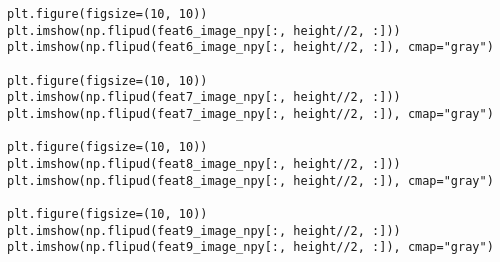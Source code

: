\begin{lstlisting}
plt.figure(figsize=(10, 10))
plt.imshow(np.flipud(feat6_image_npy[:, height//2, :]))
plt.imshow(np.flipud(feat6_image_npy[:, height//2, :]), cmap="gray")

plt.figure(figsize=(10, 10))
plt.imshow(np.flipud(feat7_image_npy[:, height//2, :]))
plt.imshow(np.flipud(feat7_image_npy[:, height//2, :]), cmap="gray")

plt.figure(figsize=(10, 10))
plt.imshow(np.flipud(feat8_image_npy[:, height//2, :]))
plt.imshow(np.flipud(feat8_image_npy[:, height//2, :]), cmap="gray")

plt.figure(figsize=(10, 10))
plt.imshow(np.flipud(feat9_image_npy[:, height//2, :]))
plt.imshow(np.flipud(feat9_image_npy[:, height//2, :]), cmap="gray")

\end{lstlisting}


